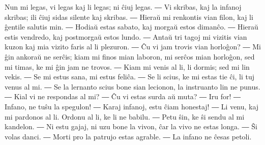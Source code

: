
Nun mi legas, vi legas kaj li legas; ni ĉiuj legas. ― Vi skribas, kaj la infanoj skribas; ili ĉiuj sidas silente kaj skribas. ― Hieraŭ mi renkontis vian filon, kaj li ĝentile salutis min. ― Hodiaŭ estas sabato, kaj morgaŭ estos dimanĉo. ― Hieraŭ estis vendredo, kaj postmorgaŭ estos lundo. ― Antaŭ tri tagoj mi vizitis vian kuzon kaj mia vizito faris al li plezuron. ― Ĉu vi jam trovis vian horloĝon? ― Mi ĝin ankoraŭ ne serĉis; kiam mi finos mian laboron, mi serĉos mian horloĝon, sed mi timas, ke mi ĝin jam ne trovos. ― Kiam mi venis al li, li dormis; sed mi lin vekis. ― Se mi estus sana, mi estus feliĉa. ― Se li scius, ke mi estas tie ĉi, li tuj venus al mi. ― Se la lernanto scius bone sian lecionon, la instruanto lin ne punus. ― Kial vi ne respondas al mi? ― Ĉu vi estas surda aŭ muta? ― Iru for! ― Infano, ne tuŝu la spegulon! ― Karaj infanoj, estu ĉiam honestaj! ― Li venu, kaj mi pardonos al li. Ordonu al li, ke li ne babilu. ― Petu ŝin, ke ŝi sendu al mi kandelon. ― Ni estu gajaj, ni uzu bone la vivon, ĉar la vivo ne estas longa. ― Ŝi volas danci. ― Morti pro la patrujo estas agrable. ― La infano ne ĉesas petoli.

